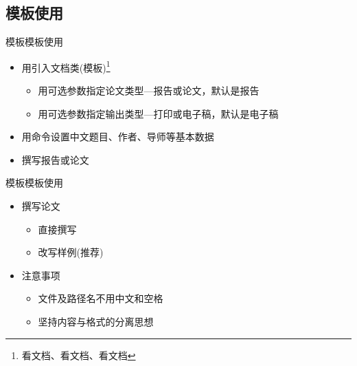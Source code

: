 \documentclass[fontset = none, xcolor=svgnames, t, aspectratio=169]{ctexbeamer}
\begin{document}
\subsection[模板使用]{模板使用}
\begin{frame}[fragile]{\nwafuprojrep 模板}{模板使用}
  \begin{itemize}  
  \item 用引入文档类(模板)\footnote[frame, 1]{看文档、看文档、看文档}
    \begin{itemize}
    \item 用可选参数指定论文类型---报告或论文，默认是报告
    \item 用可选参数指定输出类型---打印或电子稿，默认是电子稿
    \end{itemize} 
  \item 用\texinline{\nwafuset}命令设置中文题目、作者、导师等基本数据
  \begin{center}
    \begin{minipage}[h]{0.75\linewidth}
    \end{minipage}
  \end{center}\vspace{-3ex}
  \item 撰写报告或论文
  \end{itemize}
\end{frame}

\begin{frame}[t]{\nwafuprojrep 模板}{模板使用}
  \stretchon
  \begin{spacing}{1.8}  
  \begin{itemize}  
  \item 撰写论文
    \begin{itemize}
    \item 直接撰写
    \item 改写样例(\alert{推荐})
    \end{itemize}
  \item 注意事项
    \begin{itemize}
    \item 文件及路径名不用中文和空格
    \item 坚持\alert{内容与格式的分离}思想
    \end{itemize}
  \end{itemize}
  \end{spacing}
  \stretchoff
\end{frame}
\end{document}
